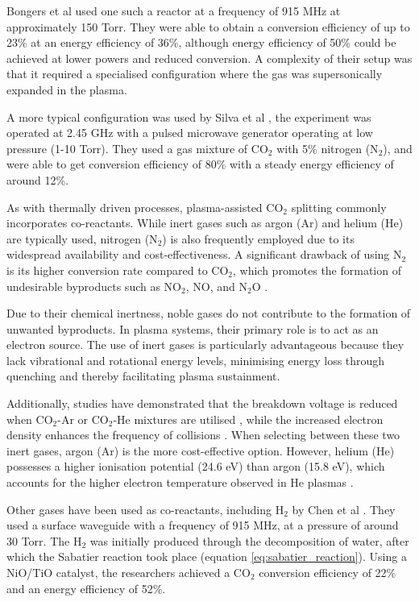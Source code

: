 Bongers et al used one such a reactor \cite{Bongers2015DevelopmentsIC} at a frequency of 915 MHz at approximately 150 Torr. They were able to obtain a conversion efficiency of up to 23\% at an energy efficiency of 36\%, although  energy efficiency of 50\% could be achieved at lower powers and reduced conversion. A complexity of their setup was that it required a specialised configuration where the gas was supersonically expanded in the plasma.

A more typical configuration was used by Silva et al \cite{Silva2014}, the experiment was operated at 2.45 GHz with a pulsed microwave generator operating at low pressure (1-10 Torr). They used a gas mixture of CO$_2$ with 5\% nitrogen (N$_2$), and were able to get conversion efficiency of 80\% with a steady energy efficiency of around 12\%. 

As with thermally driven processes, plasma-assisted CO$_2$ splitting commonly incorporates co-reactants. While inert gases such as argon (Ar) and helium (He) are typically used, nitrogen (N$_2$) is also frequently employed due to its widespread availability and cost-effectiveness. A significant drawback of using N$_2$ is its higher conversion rate compared to CO$_2$, which promotes the formation of undesirable byproducts such as NO$_2$, NO, and N$_2$O \cite{Qin2018}.  

Due to their chemical inertness, noble gases do not contribute to the formation of unwanted byproducts. In plasma systems, their primary role is to act as an electron source. The use of inert gases is particularly advantageous because they lack vibrational and rotational energy levels, minimising energy loss through quenching and thereby facilitating plasma sustainment.

Additionally, studies have demonstrated that the breakdown voltage is reduced when CO$_2$-Ar or CO$_2$-He mixtures are utilised \cite{Ramakers2015}, while the increased electron density enhances the frequency of collisions \cite{Qin2018, Ramakers2015}. When selecting between these two inert gases, argon (Ar) is the more cost-effective option. However, helium (He) possesses a higher ionisation potential (24.6 eV) than argon (15.8 eV), which accounts for the higher electron temperature observed in He plasmas \cite{Qin2018, Jeroen_Jonkers_2003}.

Other gases have been used as co-reactants, including H$_2$ by Chen et al \cite{chen2017role}. They used a surface waveguide with a frequency of 915 MHz, at a pressure of around 30 Torr. The H$_2$ was initially produced through the decomposition of water, after which the Sabatier reaction took place (equation \ref{eq:sabatier_reaction}). Using a NiO/TiO catalyst, the researchers achieved a CO$_2$ conversion efficiency of 22\% and an energy efficiency of 52\%.

